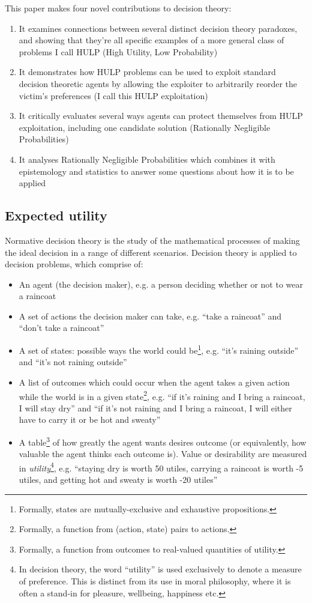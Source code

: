 \documentclass{article}
\begin{document}
This paper makes four novel contributions to decision theory:

\begin{enumerate}
\item It examines connections between several distinct decision theory paradoxes, and showing that they're all specific examples of a more general class of problems I call HULP (High Utility, Low Probability)
\item It demonstrates how HULP problems can be used to exploit standard decision theoretic agents by allowing the exploiter to arbitrarily reorder the victim's preferences (I call this HULP exploitation)
\item It critically evaluates several ways agents can protect themselves from HULP exploitation, including one candidate solution (Rationally Negligible Probabilities)
\item It analyses Rationally Negligible Probabilities which combines it with epistemology and statistics to answer some questions about how it is to be applied
\end{enumerate}

\subsection{Expected utility}
Normative decision theory is the study of the mathematical processes of making the ideal decision in a range of different scenarios. Decision theory is applied to decision problems, which comprise of:

\begin{itemize}  
\item An agent (the decision maker), e.g. a person deciding whether or not to wear a raincoat
\item A set of actions the decision maker can take, e.g. ``take a raincoat'' and ``don't take a raincoat''
\item A set of states: possible ways the world could be\footnote{Formally, states are mutually-exclusive and exhaustive propositions.}, e.g. ``it's raining outside'' and ``it's not raining outside''
\item A list of outcomes which could occur when the agent takes a given action while the world is in a given state\footnote{Formally, a function from (action, state) pairs to actions.}, e.g. ``if it's raining and I bring a raincoat, I will stay dry'' and ``if it's not raining and I bring a raincoat, I will either have to carry it or be hot and sweaty''
\item A table\footnote{Formally, a function from outcomes to real-valued quantities of utility.} of how greatly the agent wants desires outcome (or equivalently, how valuable the agent thinks each outcome is). Value or desirability are measured in \textit{utility}\footnote{In decision theory, the word ``utility'' is used exclusively to denote a measure of preference. This is distinct from its use in moral philosophy, where it is often a stand-in for pleasure, wellbeing, happiness etc.}, e.g. ``staying dry is worth 50 utiles, carrying a raincoat is worth -5 utiles, and getting hot and sweaty is worth -20 utiles''
\end{itemize}
\end{document}
